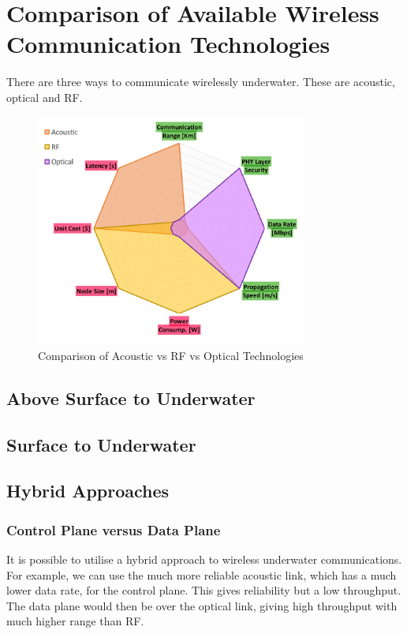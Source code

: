 \section{Comparison of Available Wireless Communication Technologies}

There are three ways to communicate wirelessly underwater. These are
acoustic, optical and \ac{RF}.

\begin{figure}[H]
  \includegraphics[width=0.8\textwidth]{acoustic_rf_optical_comparison.png}
  \caption{Comparison of Acoustic vs RF vs Optical Technologies}
  \label{fig:acoustic_rf_optical_comparison}
\end{figure}

\subsection{Above Surface to Underwater}

\subsection{Surface to Underwater}

\subsection{Hybrid Approaches}

\subsubsection{Control Plane versus Data Plane}
It is possible to utilise a hybrid approach to wireless underwater
communications. For example, we can use the much more reliable
acoustic link, which has a much lower data rate, for the control
plane. This gives reliability but a low throughput. The data plane
would then be over the optical link, giving high throughput with
much higher range than \ac{RF}.